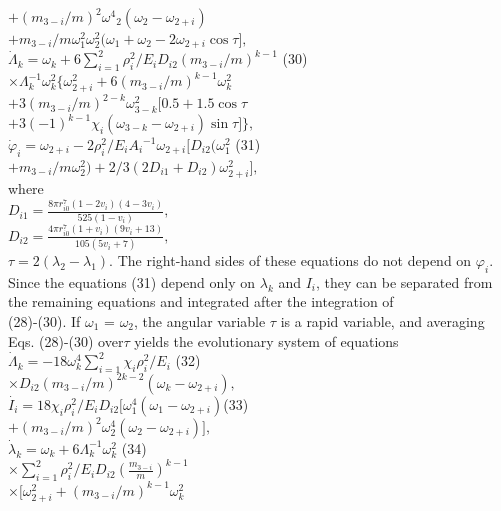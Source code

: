 \documentclass[fontsize = 11pt,a4paper]{article}
\begin{document}
\begin{multicols}{2}
$+ {(m_{3-i} / m) }^2 {\omega^4}_2(\omega_2 - \omega_{2 + i})$\\
$+ m_{3 - i} / m \omega^2_1 \omega^2_2 (\omega_1 + \omega_2 - 2 \omega_{2+i} \cos \tau],$ \\
$\dot\Lambda_k = \omega_k + 6 \sum\limits_{i=1}^{2} \rho ^2_i / E_i D_{i2}{( m_{3-i} / m)} ^ {k-1}$ \hfill (30)\\
$\times \Lambda_k ^ {-1} \omega_k ^2 \{ \omega_{2+i}^2 + 6 {( m_{3-i} / m)}^{k-1} \omega_{k}^2$\\
$+ 3 {(m_{3-i}/ m)} ^{2-k} \omega_{3-k}^2[0.5 + 1.5 \cos \tau$\\
$+ 3 {(-1)}^{k-1} \chi_i ( \omega_{3-k} - \omega_{2 + i}) \sin \tau ] \},$\\
$\dot \varphi_i = \omega_{2 + i} - 2 \rho_i ^2 / E_i {A_i} ^{-1} \omega_{2 + i} [ D_{i2}(\omega^2_1$ \hfill (31) \\
$+ m_{3-i}/m\omega^2_2) + 2/3(2 D_{i1} + D_{i2}) \omega ^2 _{2 + i}],$\\
where\\
$D_{i1} = \frac{8\pi r^7_{i0}(1-2v_i)(4-3v_i)}{525(1-v_i)},$\\
$D_{i2} = \frac{4\pi r^7_{i0}(1+v_i)(9v_i+13)}{105(5v_i+7)},$\\
$\tau = 2 (\lambda_2 - \lambda_1).$
The right-hand sides of these equations do not
depend on $\varphi_i$. Since the equations (31) depend only
on $\lambda_k$ and $I_i$, they can be separated from the remaining
equations and integrated after the integration of\\
(28)-(30). If $\omega_1$ = $\omega_2$, the angular variable $\tau$ is a rapid
variable, and averaging Eqs. (28)-(30) over$\tau$ yields
the evolutionary system of equations \\
$\dot\Lambda_k  = -18 \omega_k^4 \sum\limits_{i=1}^{2} \chi_i \rho_i^2 / E_i$ \hfill (32) \\
$\times D_{i2}{(m_{3-i}/m)}^{2k-2} (\omega_k - \omega_{2+i}),$\\
$\dot{I_i} = 18 \chi_i \rho_i^2 / E_i D_{i2}[\omega^4_1(\omega_1 - \omega_{2+i}) $\hfill (33) \\
$+ {(m_{3-i}/m)}^{2} \omega^4_2 (\omega_2 - \omega_{2+i})],$\\
$\dot\lambda_k = \omega_k + 6 \Lambda_k^{-1} \omega_k ^2$ \hfill (34) \\
$\times \sum\limits_{i=1}^{2} \rho_i^2 /  E_i D_{i2} {( \frac{m_{3-i}}{m})}^{k-1}$\\
$\times [ \omega^2_{2+i} + {(m_{3-i} / m)}^{k-1} \omega^2_k$\\

\end{multicols}
\end{document}
